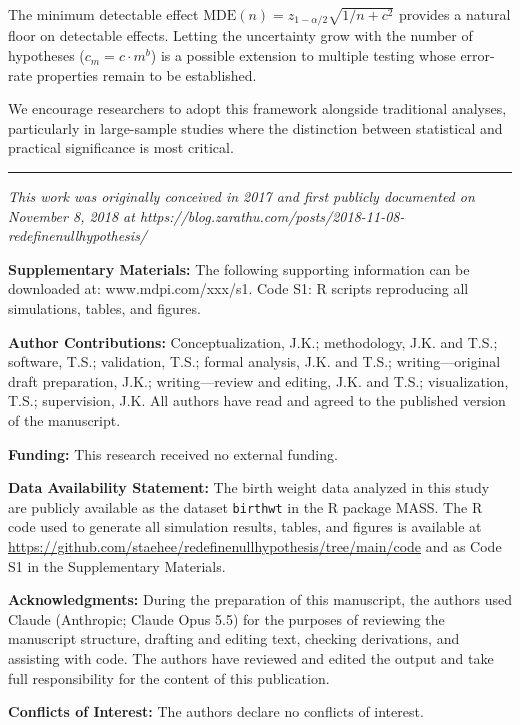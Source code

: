 \documentclass[
  11pt,
  letterpaper,
]{article}
\begin{document}
The minimum detectable effect
\(\text{MDE}(n) = z_{1-\alpha/2}\sqrt{1/n + c^2}\) provides a natural
floor on detectable effects. Letting the uncertainty grow with the
number of hypotheses (\(c_m = c \cdot m^b\)) is a possible extension to
multiple testing whose error-rate properties remain to be established.

We encourage researchers to adopt this framework alongside traditional
analyses, particularly in large-sample studies where the distinction
between statistical and practical significance is most critical.

\begin{center}\rule{0.5\linewidth}{0.5pt}\end{center}

\emph{This work was originally conceived in 2017 and first publicly
documented on November 8, 2018 at
https://blog.zarathu.com/posts/2018-11-08-redefinenullhypothesis/}

\textbf{Supplementary Materials:} The following supporting information
can be downloaded at: www.mdpi.com/xxx/s1. Code S1: R scripts
reproducing all simulations, tables, and figures.

\textbf{Author Contributions:} Conceptualization, J.K.; methodology,
J.K. and T.S.; software, T.S.; validation, T.S.; formal analysis, J.K.
and T.S.; writing---original draft preparation, J.K.; writing---review
and editing, J.K. and T.S.; visualization, T.S.; supervision, J.K. All
authors have read and agreed to the published version of the manuscript.

\textbf{Funding:} This research received no external funding.

\textbf{Data Availability Statement:} The birth weight data analyzed in
this study are publicly available as the dataset \texttt{birthwt} in the
R package MASS. The R code used to generate all simulation results,
tables, and figures is available at
\url{https://github.com/staehee/redefinenullhypothesis/tree/main/code}
and as Code S1 in the Supplementary Materials.

\textbf{Acknowledgments:} During the preparation of this manuscript, the
authors used Claude (Anthropic; Claude Opus 5.5) for the purposes of
reviewing the manuscript structure, drafting and editing text, checking
derivations, and assisting with code. The authors have reviewed and
edited the output and take full responsibility for the content of this
publication.

\textbf{Conflicts of Interest:} The authors declare no conflicts of
interest.
\end{document}
